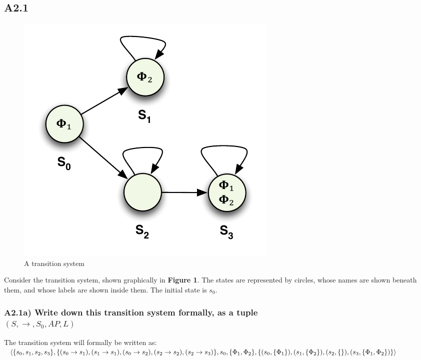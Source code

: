\documentclass[12pt]{report}
\begin{document}
\subsection*{A2.1}
\begin{figure}[H]
	\centering
	\includegraphics[scale=0.75]{../GFX/ExerciseFigure1.pdf}
	\caption{A transition system}
\end{figure}

Consider the transition system, shown graphically in \textbf{Figure 1}. The states are represented by circles, whose names are shown beneath them, and whose labels are shown inside them. The initial state is $s_0$.

\subsubsection*{A2.1a) Write down this transition system formally, as a tuple\\$(S,\rightarrow,S_0,AP,L)$}
The transition system will formally be written as:\\
$\langle\{s_0,s_1,s_2,s_3\},\{(s_0 \rightarrow s_1),(s_1 \rightarrow s_1),(s_0 \rightarrow s_2),(s_2 \rightarrow s_2),(s_2 \rightarrow s_3)\},s_0,\\
\{\Phi_1,\Phi_2\},\{(s_0, \{\Phi_1\}), (s_1, \{\Phi_2\}), (s_2, \{\}), (s_3, \{\Phi_1, \Phi_2\})\}\rangle$
\end{document}
